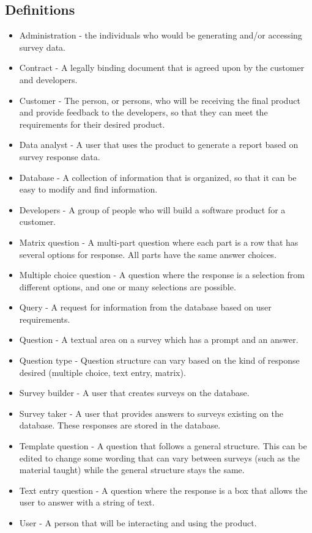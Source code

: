 \documentclass[letterpaper,10pt,serif, draftclsnofoot,onecolumn, compsoc, titlepage]{IEEEtran}
\begin{document}
\subsection{Definitions}
\begin{itemize}
\item Administration - the individuals who would be generating and/or accessing survey data.
\item Contract - A legally binding document that is agreed upon by the customer and developers.  
\item Customer - The person, or persons, who will be receiving the final product and provide feedback to the developers, so that they can meet the requirements for their desired product. 
\item Data analyst - A user that uses the product to generate a report based on survey response data.
\item Database - A collection of information that is organized, so that it can be easy to modify and find information. 
\item Developers - A group of people who will build a software product for a customer.
\item Matrix question - A multi-part question where each part is a row that has several options for response. All parts have the
same answer choices.
\item Multiple choice question - A question where the response is a selection from different options, and one or many selections
are possible.
\item Query - A request for information from the database based on user requirements.
\item Question - A textual area on a survey which has a prompt and an answer.
\item Question type - Question structure can vary based on the kind of response desired (multiple choice, text entry, matrix). 
\item Survey builder - A user that creates surveys on the database.
\item Survey taker - A user that provides answers to surveys existing on the database. These responses are stored in
the database.
\item Template question - A question that follows a general structure. This can be edited to change some wording that can
vary between surveys (such as the material taught) while the general structure stays the same.
\item Text entry question - A question where the response is a box that allows the user to answer with a string of text.
\item User - A person that will be interacting and using the product.
\end{itemize}
\end{document}
